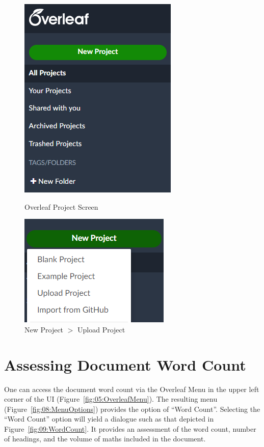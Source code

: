 \documentclass[12pt]{article}
\begin{document}
\begin{figure}[H]
\begin{minipage}[t]{7.4cm}
\begin{center}
\includegraphics[width=.5\linewidth]{11-ProjectScreenMenu.png}
\caption{Overleaf Project Screen}
\label{fig:11:ProjectScreenMenu}
\end{center}
\end{minipage}
\hfill
\begin{minipage}[t]{7.4cm}
\begin{center}
\includegraphics[width=.5\linewidth]{06-NewProject.png}
\caption{New Project $>$ Upload Project}
\label{fig:06:NewProject}
\end{center}
\end{minipage}
\end{figure}

\section{Assessing Document Word Count}
One can access the document word count via the Overleaf Menu in the upper left corner of the UI (Figure~\ref{fig:05:OverleafMenu}). The resulting menu (Figure~\ref{fig:08:MenuOptions}) provides the option of ``Word Count''. Selecting the ``Word Count'' option will yield a dialogue such as that depicted in Figure~\ref{fig:09:WordCount}. It provides an assessment of the word count, number of headings, and the volume of maths included in the document.  
\end{document}
